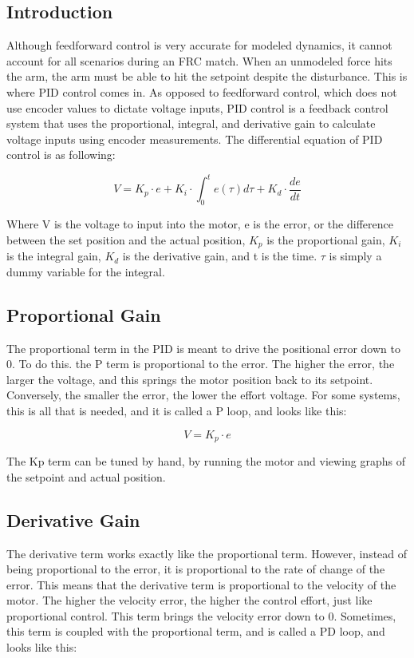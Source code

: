 \documentclass{scrartcl}
\begin{document}
\subsection{Introduction}
Although feedforward control is very accurate for modeled dynamics, it cannot account for all scenarios during an FRC match. When an unmodeled force hits the arm, the arm must be able to hit the setpoint despite the disturbance. This is where PID control comes in. As opposed to feedforward control, which does not use encoder values to dictate voltage inputs, PID control is a feedback control system that uses the proportional, integral, and derivative gain to calculate voltage inputs using encoder measurements. The differential equation of PID control is as following:

\begin{equation} \label{PID Control Equation}
    V = K_p \cdot e + K_i \cdot \int_{0}^{t} e(\tau) d\tau + K_d \cdot \frac{de}{dt}
\end{equation}

Where V is the voltage to input into the motor, e is the error, or the difference between the set position and the actual position, \(K_p\) is the proportional gain, \(K_i\) is the integral gain, \(K_d\) is the derivative gain, and t is the time. \(\tau\) is simply a dummy variable for the integral.

\subsection{Proportional Gain}
The proportional term in the PID is meant to drive the positional error down to 0. To do this. the P term is proportional to the error. The higher the error, the larger the voltage, and this springs the motor position back to its setpoint. Conversely, the smaller the error, the lower the effort voltage. For some systems, this is all that is needed, and it is called a P loop, and looks like this:

\begin{equation} \label{P Loop}
    V = K_p \cdot e
\end{equation}

The Kp term can be tuned by hand, by running the motor and viewing graphs of the setpoint and actual position.

\subsection{Derivative Gain}
The derivative term works exactly like the proportional term. However, instead of being proportional to the error, it is proportional to the rate of change of the error. This means that the derivative term is proportional to the velocity of the motor. The higher the velocity error, the higher the control effort, just like proportional control. This term brings the velocity error down to 0. Sometimes, this term is coupled with the proportional term, and is called a PD loop, and looks like this:
\end{document}
